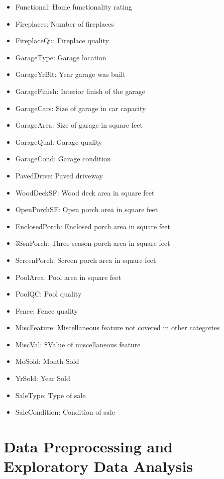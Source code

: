\documentclass[sigconf]{acmart}
\begin{document}
\begin{itemize}
		\item Functional: Home functionality rating
		\item Fireplaces: Number of fireplaces
		\item FireplaceQu: Fireplace quality
		\item GarageType: Garage location
		\item GarageYrBlt: Year garage was built
		\item GarageFinish: Interior finish of the garage
		\item GarageCars: Size of garage in car capacity
		\item GarageArea: Size of garage in square feet
		\item GarageQual: Garage quality
		\item GarageCond: Garage condition
		\item PavedDrive: Paved driveway
		\item WoodDeckSF: Wood deck area in square feet
		\item OpenPorchSF: Open porch area in square feet
		\item EnclosedPorch: Enclosed porch area in square feet
		\item 3SsnPorch: Three season porch area in square feet
		\item ScreenPorch: Screen porch area in square feet
		\item PoolArea: Pool area in square feet
		\item PoolQC: Pool quality
		\item Fence: Fence quality
		\item MiscFeature: Miscellaneous feature not covered in other categories
		\item MiscVal: \$Value of miscellaneous feature
		\item MoSold: Month Sold
		\item YrSold: Year Sold
		\item SaleType: Type of sale
		\item SaleCondition: Condition of sale
	\end{itemize}
	
	
	\section{Data Preprocessing and Exploratory Data Analysis} %
	
\end{document}
